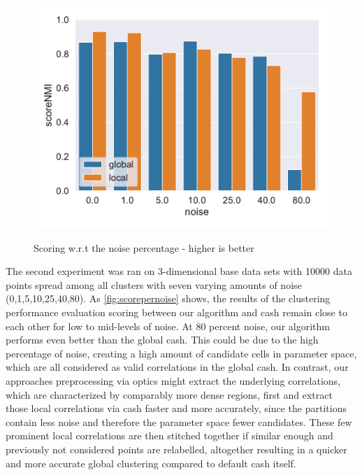 \begin{figure}[h]
\begin{minipage}[t]{.5\textwidth}
      \includegraphics[width=\textwidth]{evaluation/per_noise/Best_NMI_3D_O10000_pnoise_bar.pdf}
      \label{fig:nmiperpts}
    \end{minipage}    
    \caption{Scoring w.r.t the noise percentage - higher is better}
    \label{fig:scorepernoise}
\end{figure}
The second experiment was ran on 3-dimensional base data sets with 10000 data points spread among all clusters with seven varying amounts of noise (0,1,5,10,25,40,80).
As \autoref{fig:scorepernoise} shows, the results of the clustering performance evaluation scoring between our algorithm and \gls{cash} remain close to each other for low to mid-levels of noise. At 80 percent noise, our algorithm performs even better than the global \gls{cash}. This could be due to the high percentage of noise, creating a high amount of candidate cells in parameter space, which are all considered as valid correlations in the global \gls{cash}. In contrast, our approaches preprocessing via \gls{optics} might extract the underlying correlations, which are characterized by comparably more dense regions, first and extract those local correlations via \gls{cash} faster and more accurately, since the partitions contain less noise and therefore the parameter space fewer candidates. These few prominent local correlations are then stitched together if similar enough and previously not considered points are relabelled, altogether resulting in a quicker and more accurate global clustering compared to default \gls{cash} itself.

